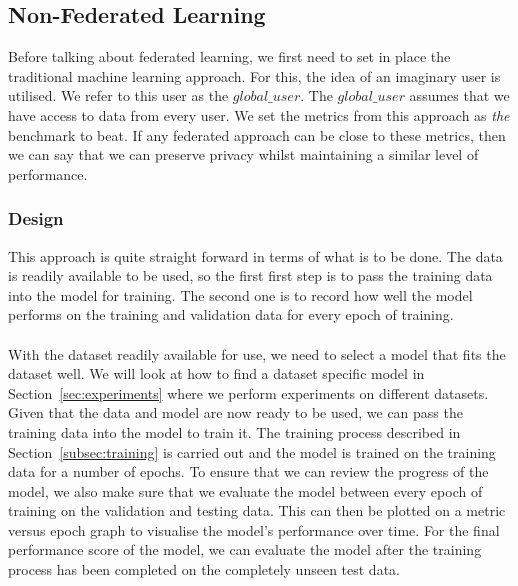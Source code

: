 \documentclass[12pt]{article}
\begin{document}
\subsection{Non-Federated Learning}\label{subsec:global-approach}
Before talking about federated learning, we first need to set in place the traditional machine learning approach. For this, the idea of an imaginary user is utilised. We refer to this user as the $global\_user$. The $global\_user$ assumes that we have access to data from every user. We set the metrics from this approach as \textit{the} benchmark to beat. If any federated approach can be close to these metrics, then we can say that we can preserve privacy whilst maintaining a similar level of performance.
\subsubsection{Design}
This approach is quite straight forward in terms of what is to be done. The data is readily available to be used, so the first first step is to pass the training data into the model for training. The second one is to record how well the model performs on the training and validation data for every epoch of training.
\\\\
With the dataset readily available for use, we need to select a model that fits the dataset well. We will look at how to find a dataset specific model in Section~\ref{sec:experiments} where we perform experiments on different datasets. Given that the data and model are now ready to be used, we can pass the training data into the model to train it. The training process described in Section~\ref{subsec:training} is carried out and the model is trained on the training data for a number of epochs. To ensure that we can review the progress of the model, we also make sure that we evaluate the model between every epoch of training on the validation and testing data. This can then be plotted on a metric versus epoch graph to visualise the model's performance over time. For the final performance score of the model, we can evaluate the model after the training process has been completed on the completely unseen test data.
\end{document}
